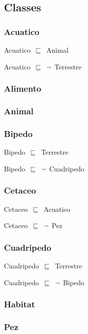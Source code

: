 \subsection*{Classes}

\subsubsection*{Acuatico}

Acuatico~\ensuremath{\sqsubseteq}~Animal~

Acuatico~\ensuremath{\sqsubseteq}~\ensuremath{\lnot}~Terrestre

\subsubsection*{Alimento}

\subsubsection*{Animal}

\subsubsection*{Bipedo}

Bipedo~\ensuremath{\sqsubseteq}~Terrestre~

Bipedo~\ensuremath{\sqsubseteq}~\ensuremath{\lnot}~Cuadripedo

\subsubsection*{Cetaceo}

Cetaceo~\ensuremath{\sqsubseteq}~Acuatico~

Cetaceo~\ensuremath{\sqsubseteq}~\ensuremath{\lnot}~Pez

\subsubsection*{Cuadripedo}

Cuadripedo~\ensuremath{\sqsubseteq}~Terrestre~

Cuadripedo~\ensuremath{\sqsubseteq}~\ensuremath{\lnot}~Bipedo

\subsubsection*{Habitat}

\subsubsection*{Pez}

